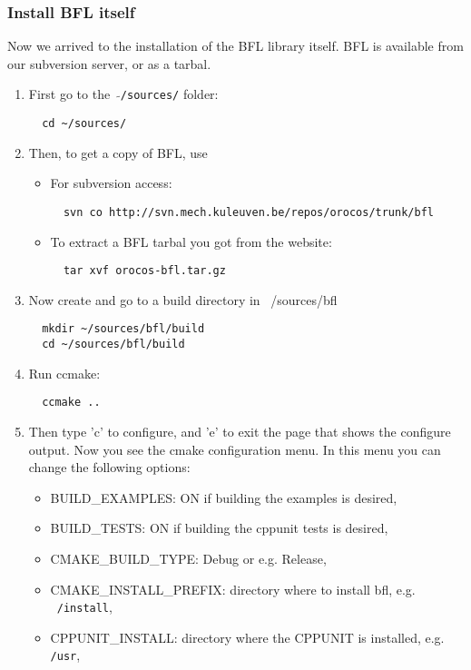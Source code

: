 \documentclass[a4paper,10pt]{article}
\begin{document}
\subsubsection{Install BFL itself}
Now we arrived to the installation of the BFL library itself. BFL is
available from our subversion server, or as a tarbal.
\begin{enumerate}
\item First go to the \ $\mathtt{\tilde{ }}$\texttt{/sources/} folder:
\begin{verbatim}
  cd ~/sources/
\end{verbatim}
\item Then, to get a copy of BFL, use
 \begin{itemize}
 \item For subversion access:
\begin{verbatim}
  svn co http://svn.mech.kuleuven.be/repos/orocos/trunk/bfl
\end{verbatim}
 \item To extract a BFL tarbal you got from the website:
\begin{verbatim}
  tar xvf orocos-bfl.tar.gz
\end{verbatim}
\end{itemize}
\item Now create and go to a build directory in ~/sources/bfl
\begin{verbatim}
  mkdir ~/sources/bfl/build
  cd ~/sources/bfl/build
\end{verbatim}
\item Run ccmake:
\begin{verbatim}
  ccmake ..
\end{verbatim}
\item Then type 'c' to configure, and 'e' to exit the page that shows
  the configure output. Now you see the cmake configuration menu. In
  this menu you can change the following options:
\begin{itemize}
 \item BUILD\_EXAMPLES: ON if building the examples is desired,
 \item BUILD\_TESTS: ON if building the cppunit tests is desired,
 \item CMAKE\_BUILD\_TYPE: Debug or e.g. Release,
 \item CMAKE\_INSTALL\_PREFIX: directory where to install bfl, e.g. \texttt{~/install}, 
 \item CPPUNIT\_INSTALL: directory where the CPPUNIT is installed, e.g. \texttt{/usr},

\end{itemize}
\end{enumerate}
\end{document}
